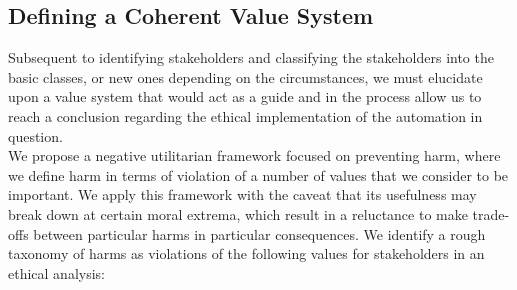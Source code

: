 \subsection{Defining a Coherent Value System}
\label{sec:-value}
Subsequent to identifying stakeholders and classifying the stakeholders into the basic classes, or new ones depending on the circumstances, we must elucidate upon a value system that would act as a guide and in the process allow us to reach a conclusion regarding the ethical implementation of the automation in question. \\
We propose a negative utilitarian framework focused on preventing harm, where we define harm in terms of violation of a number of values that we consider to be important.  We apply this framework with the caveat that its usefulness may break down at certain moral extrema, which result in a reluctance to make trade-offs between particular harms in particular consequences.
We identify a rough taxonomy of harms as violations of the following values for stakeholders in an ethical analysis:
